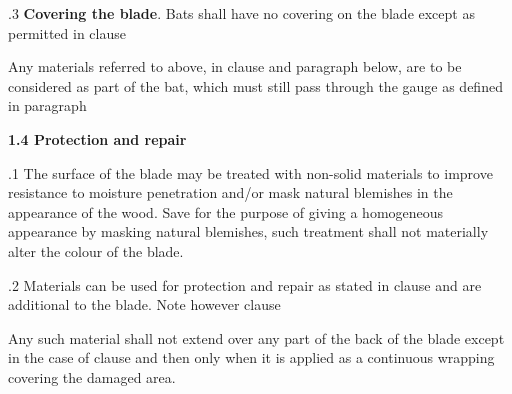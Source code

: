 \documentclass[12pt]{article}
\begin{document}
\vspace{\baselineskip}
{\fontsize{9pt}{10.8pt}.3 \tabto{0.49in} \textbf{Covering the blade}. Bats shall have no covering on the blade except as permitted in clause \par}\par


\vspace{\baselineskip}
\begin{adjustwidth}{0.49in}{0.1in}
{\fontsize{9pt}{10.8pt}\selectfont Any materials referred to above, in clause and paragraph below, are to be considered as part of the bat, which must still pass through the gauge as defined in paragraph \par}\par

\end{adjustwidth}


\vspace{\baselineskip}
{\fontsize{11pt}{13.2pt}\selectfont \textbf{1.4 \tabto{0.47in} Protection and repair}\par}\par


\vspace{\baselineskip}
\begin{adjustwidth}{0.5in}{0.01in}
{\fontsize{9pt}{10.8pt}.1 \tabto{0.49in} The surface of the blade may be treated with non-solid materials to improve resistance to moisture penetration and/or mask natural blemishes in the appearance of the wood. Save for the purpose of giving a homogeneous appearance by masking natural blemishes, such treatment shall not materially alter the colour of the blade.\par}\par

\end{adjustwidth}


\vspace{\baselineskip}
\begin{adjustwidth}{0.5in}{0.08in}
{\fontsize{9pt}{10.8pt}.2 \tabto{0.49in} Materials can be used for protection and repair as stated in clause and are additional to the blade. Note however clause \par}\par

\end{adjustwidth}


\vspace{\baselineskip}
\begin{adjustwidth}{0.5in}{0.11in}
{\fontsize{9pt}{10.8pt}\selectfont Any such material shall not extend over any part of the back of the blade except in the case of clause  and then only when it is applied as a continuous wrapping covering the damaged area.\par}\par

\end{adjustwidth}
\end{document}
